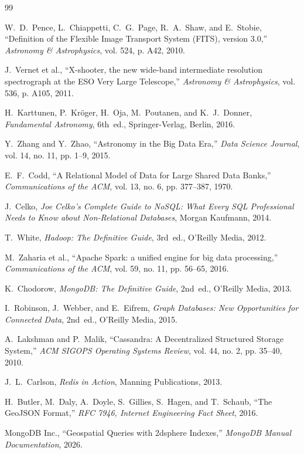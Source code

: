 \documentclass[10pt]{article}
\begin{document}
\begin{thebibliography}{99}
\setlength{\itemsep}{2pt}
\setlength{\parskip}{0pt}
\small

W.~D.~Pence, L.~Chiappetti, C.~G.~Page, R.~A.~Shaw, and E.~Stobie,
\newblock ``Definition of the Flexible Image Transport System (FITS), version 3.0,''
\newblock \emph{Astronomy \& Astrophysics}, vol. 524, p. A42, 2010.

J.~Vernet et al.,
\newblock ``X-shooter, the new wide-band intermediate resolution spectrograph at the ESO Very Large Telescope,''
\newblock \emph{Astronomy \& Astrophysics}, vol. 536, p. A105, 2011.

H.~Karttunen, P.~Kr{\"o}ger, H.~Oja, M.~Poutanen, and K.~J.~Donner,
\newblock \emph{Fundamental Astronomy},
\newblock 6th~ed., Springer-Verlag, Berlin, 2016.

Y.~Zhang and Y.~Zhao,
\newblock ``Astronomy in the Big Data Era,''
\newblock \emph{Data Science Journal}, vol. 14, no. 11, pp. 1--9, 2015.

E.~F.~Codd,
\newblock ``A Relational Model of Data for Large Shared Data Banks,''
\newblock \emph{Communications of the ACM}, vol. 13, no. 6, pp. 377--387, 1970.

J.~Celko,
\newblock \emph{Joe Celko's Complete Guide to NoSQL: What Every SQL Professional Needs to Know about Non-Relational Databases},
\newblock Morgan Kaufmann, 2014.

T.~White,
\newblock \emph{Hadoop: The Definitive Guide},
\newblock 3rd~ed., O'Reilly Media, 2012.

M.~Zaharia et al.,
\newblock ``Apache Spark: a unified engine for big data processing,''
\newblock \emph{Communications of the ACM}, vol. 59, no. 11, pp. 56--65, 2016.

K.~Chodorow,
\newblock \emph{MongoDB: The Definitive Guide},
\newblock 2nd~ed., O'Reilly Media, 2013.

I.~Robinson, J.~Webber, and E.~Eifrem,
\newblock \emph{Graph Databases: New Opportunities for Connected Data},
\newblock 2nd~ed., O'Reilly Media, 2015.

A.~Lakshman and P.~Malik,
\newblock ``Cassandra: A Decentralized Structured Storage System,''
\newblock \emph{ACM SIGOPS Operating Systems Review}, vol. 44, no. 2, pp. 35--40, 2010.

J.~L.~Carlson,
\newblock \emph{Redis in Action},
\newblock Manning Publications, 2013.

H.~Butler, M.~Daly, A.~Doyle, S.~Gillies, S.~Hagen, and T.~Schaub,
\newblock ``The GeoJSON Format,''
\newblock \emph{RFC 7946, Internet Engineering Fact Sheet}, 2016.

MongoDB Inc.,
\newblock ``Geospatial Queries with 2dsphere Indexes,''
\newblock \emph{MongoDB Manual Documentation}, 2026.

\end{thebibliography}
\end{document}
